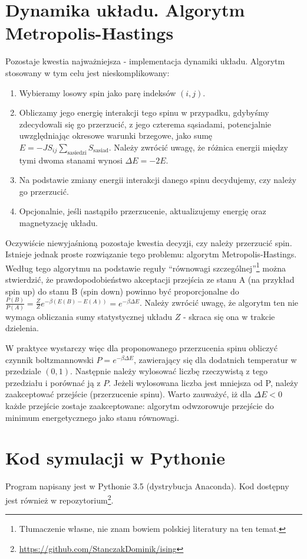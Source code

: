 \documentclass[11pt]{article}
\begin{document}
\section{Dynamika układu. Algorytm Metropolis-Hastings}
Pozostaje kwestia najważniejsza - implementacja dynamiki układu. Algorytm stosowany
w tym celu jest nieskomplikowany:
\begin{enumerate}
  \item Wybieramy losowy spin jako parę indeksów $(i,j)$.
  \item Obliczamy jego energię interakcji tego spinu w przypadku, gdybyśmy zdecydowali się go przerzucić, z jego czterema sąsiadami, potencjalnie
  uwzględniając okresowe warunki brzegowe, jako sumę $E=-J S_{ij}\sum_{\text{sasiedzi}}{S_{\text{sasiad}}}$. Należy zwrócić uwagę, że różnica
  energii między tymi dwoma stanami wynosi $\Delta E = -2 E$.
  \item Na podstawie zmiany energii interakcji danego spinu decydujemy, czy należy go przerzucić.
  \item Opcjonalnie, jeśli nastąpiło przerzucenie, aktualizujemy energię oraz magnetyzację układu.
\end{enumerate}
Oczywiście niewyjaśnioną pozostaje kwestia decyzji, czy należy przerzucić spin. Istnieje jednak proste rozwiązanie
tego problemu: algorytm Metropolis-Hastings. Według tego algorytmu na podstawie reguły ``równowagi szczególnej''\footnote{Tłumaczenie własne,
nie znam bowiem polskiej literatury na ten temat.} można stwierdzić, że prawdopodobieństwo akceptacji przejścia ze stanu A (na przykład spin up)
do stanu B (spin down) powinno być proporcjonalne do $\frac{P(B)}{P(A)} = \frac{Z}{Z} e^{-\beta(E(B)-E(A))}=e^{-\beta \Delta E}$. Należy zwrócić uwagę,
że algorytm ten nie wymaga obliczania sumy statystycznej układu $Z$ - skraca się ona w trakcie dzielenia.

W praktyce wystarczy więc dla proponowanego przerzucenia spinu obliczyć czynnik boltzmannowski $P=e^{-\beta \Delta E}$, zawierający się dla dodatnich
temperatur w przedziale $(0,1)$. Następnie należy wylosować liczbę rzeczywistą z tego przedziału i porównać ją z $P$. Jeżeli wylosowana liczba jest
mniejsza od P, należy zaakceptować przejście (przerzucenie spinu). Warto zauważyć, iż dla $\Delta E < 0$ każde przejście zostaje zaakceptowane:
algorytm odwzorowuje przejście do minimum energetycznego jako stanu równowagi.
\section{Kod symulacji w Pythonie}
Program napisany jest w Pythonie 3.5 (dystrybucja Anaconda). Kod dostępny jest również
w repozytorium\footnote{\url{https://github.com/StanczakDominik/ising}}.
\end{document}
